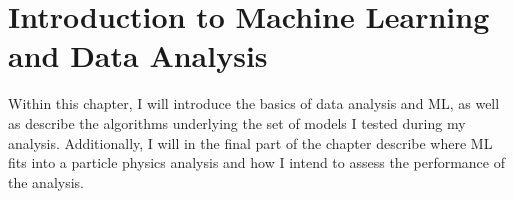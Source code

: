 \chapter{Introduction to Machine Learning and Data Analysis}\label{chap:Intro ML}
Within this chapter, I will introduce the basics of data analysis and \ac{ML}, as well as describe the 
algorithms underlying the set of models I tested during my analysis. Additionally, I will in the final part of the chapter 
describe where \ac{ML} fits into a particle physics analysis and how I intend to assess the performance of the analysis.

